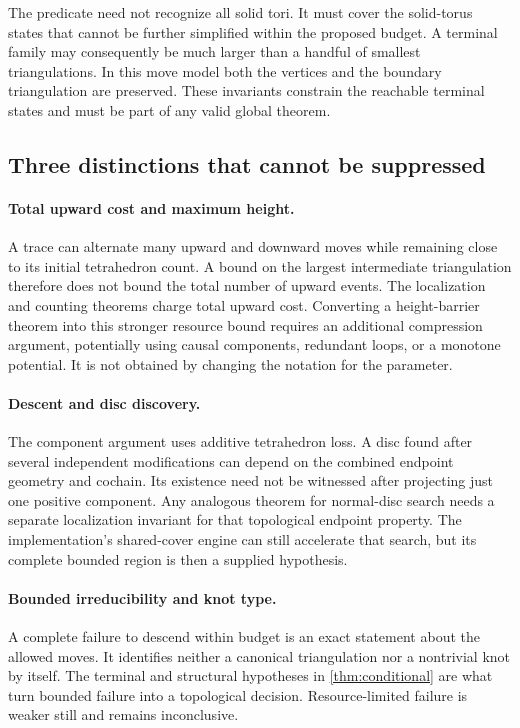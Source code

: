 The predicate need not recognize all solid tori. It must cover the
solid-torus states that cannot be further simplified within the proposed
budget. A terminal family may consequently be much larger than a handful
of smallest triangulations. In this move model both the vertices and the
boundary triangulation are preserved. These invariants constrain the
reachable terminal states and must be part of any valid global theorem.

\subsection{Three distinctions that cannot be suppressed}

\paragraph{Total upward cost and maximum height.}
A trace can alternate many upward and downward moves while remaining close
to its initial tetrahedron count. A bound on the largest intermediate
triangulation therefore does not bound the total number of upward events.
The localization and counting theorems charge total upward cost. Converting
a height-barrier theorem into this stronger resource bound requires an
additional compression argument, potentially using causal components,
redundant loops, or a monotone potential. It is not obtained by changing
the notation for the parameter.

\paragraph{Descent and disc discovery.}
The component argument uses additive tetrahedron loss. A disc found after
several independent modifications can depend on the combined endpoint
geometry and cochain. Its existence need not be witnessed after projecting
just one positive component. Any analogous theorem for normal-disc search
needs a separate localization invariant for that topological endpoint
property. The implementation's shared-cover engine can still accelerate
that search, but its complete bounded region is then a supplied hypothesis.

\paragraph{Bounded irreducibility and knot type.}
A complete failure to descend within budget is an exact statement about
the allowed moves. It identifies neither a canonical triangulation nor a
nontrivial knot by itself. The terminal and structural hypotheses in
\cref{thm:conditional} are what turn bounded failure into a topological
decision. Resource-limited failure is weaker still and remains inconclusive.

